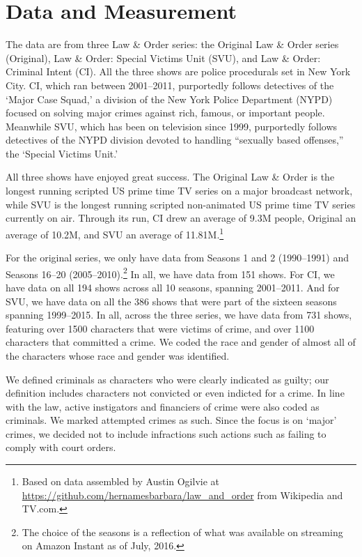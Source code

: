 \documentclass[12pt, letterpaper]{article}
\begin{document}
\section*{Data and Measurement}
The data are from three Law \& Order series: the Original Law \& Order series (Original), Law \& Order: Special Victims Unit (SVU), and Law \& Order: Criminal Intent (CI). All the three shows are police procedurals set in New York City. CI, which ran between 2001--2011, purportedly follows detectives of the `Major Case Squad,' a division of the New York Police Department (NYPD) focused on solving major crimes against rich, famous, or important people. Meanwhile SVU, which has been on television since 1999, purportedly follows detectives of the NYPD division devoted to handling ``sexually based offenses,'' the `Special Victims Unit.'

All three shows have enjoyed great success. The Original Law \& Order is the longest running scripted US prime time TV series on a major broadcast network, while SVU is the longest running scripted non-animated US prime time TV series currently on air. Through its run, CI drew an average of 9.3M people, Original an average of 10.2M, and SVU an average of 11.81M.\footnote{Based on data assembled by Austin Ogilvie at \href{https://github.com/hernamesbarbara/law_and_order}{https://github.com/hernamesbarbara/law\_and\_order} from Wikipedia and TV.com.}

For the original series, we only have data from Seasons 1 and 2 (1990--1991) and Seasons 16--20 (2005--2010).\footnote{The choice of the seasons is a reflection of what was available on streaming on Amazon Instant as of July, 2016.} In all, we have data from 151 shows. For CI, we have data on all 194 shows across all 10 seasons, spanning 2001--2011. And for SVU, we have data on all the 386 shows that were part of the sixteen seasons spanning 1999--2015. In all, across the three series, we have data from 731 shows, featuring over 1500 characters that were victims of crime, and over 1100 characters that committed a crime. We coded the race and gender of almost all of the characters whose race and gender was identified. 

We defined criminals as characters who were clearly indicated as guilty; our definition includes characters not convicted or even indicted for a crime. In line with the law, active instigators and financiers of crime were also coded as criminals. We marked attempted crimes as such. Since the focus is on `major' crimes, we decided not to include infractions such actions such as failing to comply with court orders. 
\end{document}
